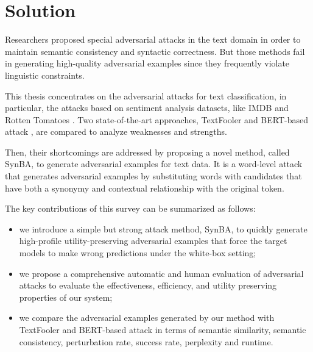 
\section{Solution}\label{sec:solution}
Researchers proposed special adversarial attacks in the text domain in order to maintain semantic consistency and syntactic correctness.
But those methods fail in generating high-quality adversarial examples since they frequently violate linguistic constraints.

This thesis concentrates on the adversarial attacks for text classification, in particular, the attacks based on sentiment analysis datasets, like IMDB \cite{maas-EtAl:2011:ACL-HLT2011} and Rotten Tomatoes \cite{pang-lee:2005a}.
Two state-of-the-art approaches, TextFooler \cite{journals/corr/abs-1907-11932} and BERT-based attack \cite{conf/emnlp/GargR20}, are compared to analyze weaknesses and strengths.

Then, their shortcomings are addressed by proposing a novel method, called SynBA, to generate adversarial examples for text data.
It is a word-level attack that generates adversarial examples by substituting words with candidates that have both a synonymy and contextual relationship with the original token.

The key contributions of this survey can be summarized as follows:
\begin{itemize}
    \item we introduce a simple but strong attack method, SynBA, to quickly generate high-profile utility-preserving adversarial examples that force the target models to make wrong predictions under the white-box setting;
    \item we propose a comprehensive automatic and human evaluation of adversarial attacks to evaluate the effectiveness, efficiency, and utility preserving properties of our system;
    \item we compare the adversarial examples generated by our method with TextFooler and BERT-based attack in terms of semantic similarity, semantic consistency, perturbation rate, success rate, perplexity and runtime.
\end{itemize}



